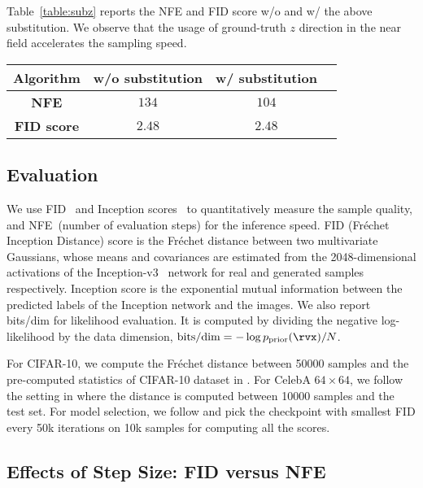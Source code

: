 Table~\ref{table:subz} reports the NFE and FID score w/o and w/ the above substitution. We observe that the usage of ground-truth $z$ direction in the near field accelerates the sampling speed.

\begin{table*}[htb]
\begin{center}
\caption{NFE and FID scores of w/ and w/o substitution}
\label{table:subz}
\begin{tabular}{c c c c}
		\toprule
		\textbf{Algorithm} &  w/o substitution &w/ substitution\\
		\midrule
        \textbf{NFE} &  $134$ &$104$ \\
        \textbf{FID score} & $2.48$ & $2.48$ \\
        \bottomrule
\end{tabular}
\end{center}
\end{table*}

\subsection{Evaluation}

We use FID~\cite{Heusel2017GANsTB} and Inception scores~\cite{Salimans2016ImprovedTF} to quantitatively measure the sample quality, and NFE~(number of evaluation steps) for the inference speed. {FID (Fréchet Inception Distance) score is the Fréchet distance between two multivariate Gaussians, whose means and covariances are estimated from the 2048-dimensional activations of the Inception-v3~\citep{Szegedy2016RethinkingTI} network for real and generated samples respectively.} Inception score is the exponential mutual information between the predicted labels of the Inception network and the images. We also report bits/dim for likelihood evaluation. It is computed by dividing the negative log-likelihood by the data dimension, \ie $\textrm{bits/dim} = -\log p_{\textrm{prior}}(\rvx)/N$.

For CIFAR-10, we compute the Fréchet distance between 50000 samples and the pre-computed statistics of CIFAR-10 dataset in \cite{Heusel2017GANsTB}. For CelebA $64 \times 64$, we follow the setting in \cite{Song2020ImprovedTF} where the distance is computed between 10000 samples and the test set. For model selection, we follow \cite{Song2020ImprovedTF} and pick the checkpoint with smallest FID every 50k iterations on 10k samples for computing all the scores.

\subsection{Effects of Step Size: FID versus NFE}

